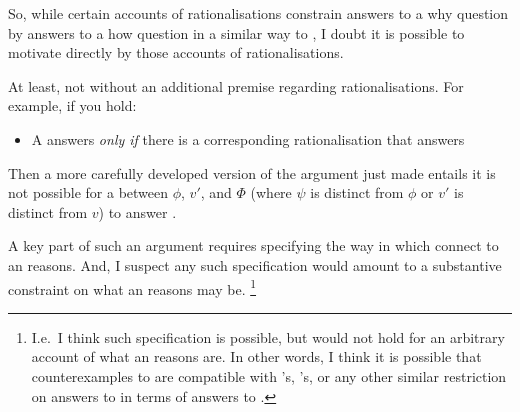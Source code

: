 \begin{note}
  So, while certain accounts of rationalisations constrain answers to a why question by answers to a how question in a similar way to \issueInclusion{}, I doubt it is possible to motivate \issueInclusion{} directly by those accounts of rationalisations.

  At least, not without an additional premise regarding rationalisations.
  For example, if you hold:
  \begin{itemize}
  \item
    A \ros{} answers \qWhy{} \emph{only if} there is a corresponding rationalisation that answers \qWhyR{}
  \end{itemize}
  Then a more carefully developed version of the argument just made entails it is not possible for a \ros{} between \(\phi\), \(v'\), and \(\Phi\) (where \(\psi\) is distinct from \(\phi\) or \(v'\) is distinct from \(v\)) to answer \qWhy{}.

  A key part of such an argument requires specifying the way in which \ros{} connect to an \agents{} reasons.
  And, I suspect any such specification would amount to a substantive constraint on what an \agents{} reasons may be.%
  \footnote{
    I.e.\ I think such specification is possible, but would not hold for an arbitrary account of what an \agents{} reasons are.
    In other words, I think it is possible that counterexamples to \issueInclusion{} are compatible with \citeauthor{Davidson:1963aa}'s, \citeauthor{Hieronymi:2011aa}'s, or any other similar restriction on answers to \qWhyR{} in terms of answers to \qHowR{}.
  }
\end{note}






